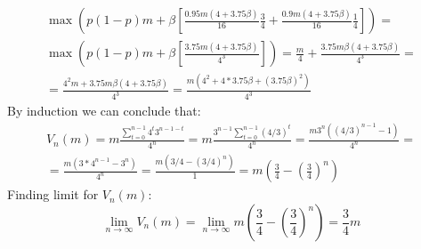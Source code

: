 \documentclass[11pt, oneside]{article}
\renewcommand{\b}{\beta}
\begin{document}
\begin{enumerate}[(a)]
\begin{gather*}
	\max \left( p(1-p)m + \b \left[ \frac{0.95m(4 + 3.75 \b)}{16}\frac{3}{4} + \frac{0.9m(4 + 3.75 \b)}{16}\frac{1}{4} \right] \right) = \\
	\max \left( p(1-p)m + \b \left[ \frac{3.75m(4 + 3.75 \b)}{4^{3}} \right] \right) = \frac{m}{4} + \frac{3.75m\b(4+3.75\b)}{4^{3}} = \\
	= \frac{4^{2}m + 3.75m\b(4 + 3.75\b)}{4^{3}} = \frac{m(4^{2} +4*3.75\b + (3.75\b)^{2})}{4^{3}}
\end{gather*}
By induction we can conclude that:
\begin{gather*}
V_{n}(m) = m\frac{\sum_{t=0}^{n-1}4^{t}3^{n-1-t}}{4^{n}} = m\frac{3^{n-1}\sum_{t=0}^{n-1} (4/3)^{t}}{4^{n}} = \frac{m3^{n}((4/3)^{n-1} - 1)}{4^{n}} = \\
= \frac{m(3*4^{n-1} - 3^{n})}{4^{n}} = \frac{m(3/4 - (3/4)^{n})}{1} = m\left( \frac{3}{4} - \left(\frac{3}{4}\right)^{n} \right)
\end{gather*}
Finding limit for $ V_{n}(m) $:
\[
\lim_{n\to\infty} V_{n}(m) = \lim_{n\to\infty}m\left( \frac{3}{4} - \left(\frac{3}{4}\right)^{n} \right) = \frac{3}{4}m
\]

\end{enumerate}

	
\end{document}
